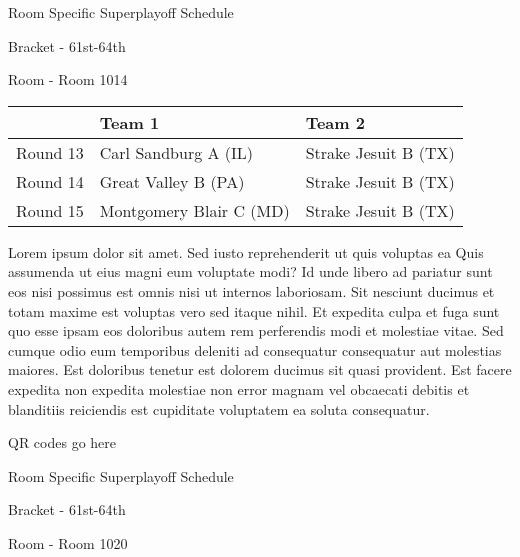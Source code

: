 \documentclass{article}%
\begin{document}
\newpage%
\begin{center}%
\begin{Huge}%
Room Specific Superplayoff Schedule%
\end{Huge}%
\vspace*{8pt}%
\linebreak%
\begin{Large}%
Bracket {-} 61st{-}64th%
\end{Large}%
\vspace*{8pt}%
\linebreak%
\vspace*{8pt}%
\begin{Large}%
Room {-} Room 1014%
\end{Large}%
\end{center}%
%
\begin{tabularx}{\textwidth}{|c|Y|Y|}%
\hline%
&Team 1&Team 2\\%
\hline%
Round 13&Carl Sandburg A (IL)&Strake Jesuit B (TX)\\%
Round 14&Great Valley B (PA)&Strake Jesuit B (TX)\\%
Round 15&Montgomery Blair C (MD)&Strake Jesuit B (TX)\\%
\hline%
\end{tabularx}%
\vspace*{8pt}%
\newline%
Lorem ipsum dolor sit amet. Sed iusto reprehenderit ut quis voluptas ea Quis assumenda ut eius magni eum voluptate modi? Id unde libero ad pariatur sunt eos nisi possimus est omnis nisi ut internos laboriosam. Sit nesciunt ducimus et totam maxime est voluptas vero sed itaque nihil. Et expedita culpa et fuga sunt quo esse ipsam eos doloribus autem rem perferendis modi et molestiae vitae.\newline%
\newline%
Sed cumque odio eum temporibus deleniti ad consequatur consequatur aut molestias maiores. Est doloribus tenetur est dolorem ducimus sit quasi provident. Est facere expedita non expedita molestiae non error magnam vel obcaecati debitis et blanditiis reiciendis est cupiditate voluptatem ea soluta consequatur.%
\vspace*{140pt}%
\begin{center}%
\begin{Huge}%
QR codes go here%
\end{Huge}%
\end{center}%
\newpage%
\begin{center}%
\begin{Huge}%
Room Specific Superplayoff Schedule%
\end{Huge}%
\vspace*{8pt}%
\linebreak%
\begin{Large}%
Bracket {-} 61st{-}64th%
\end{Large}%
\vspace*{8pt}%
\linebreak%
\vspace*{8pt}%
\begin{Large}%
Room {-} Room 1020%
\end{Large}%
\end{center}%
\end{document}
